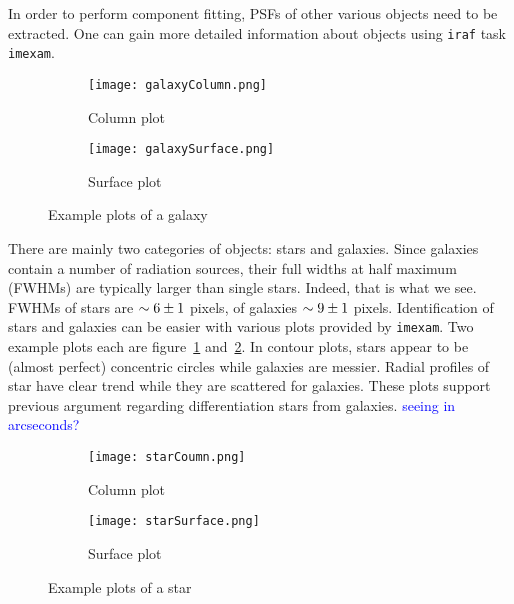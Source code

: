 In order to perform component fitting, PSFs of other various objects need to be extracted. One can gain more detailed information about objects using \verb|iraf| task \verb|imexam|. 

\begin{figure}[ht]
   \centering
   \begin{subfigure}[t]{0.5\textwidth}
   \begin{center}
   \texttt{[image: galaxyColumn.png]}
   \end{center}
   \caption{Column plot}
   \end{subfigure}%
   \begin{subfigure}[t]{0.5\textwidth}
   \begin{center}
   \texttt{[image: galaxySurface.png]}
   \end{center}
   \caption{Surface plot}
   \end{subfigure}
   \caption{Example plots of a galaxy}%
   \label{fig:galaxyPlots}
\end{figure}

There are mainly two categories of objects: stars and galaxies. Since galaxies contain a number of radiation sources, their full widths at half maximum (FWHMs) are typically larger than single stars. Indeed, that is what we see. FWHMs of stars are $\sim\num{6+-1}$ pixels, of galaxies $\sim\num{9+-1}$ pixels. Identification of stars and galaxies can be easier with various plots provided by \verb|imexam|. Two example plots each are figure~\ref{fig:galaxyPlots} and~\ref{fig:starPlots}. In contour plots, stars appear to be (almost perfect) concentric circles while galaxies are messier. Radial profiles of star have clear trend while they are scattered for galaxies. These plots support previous argument regarding differentiation stars from galaxies.
\textcolor{blue}{seeing in arcseconds?}
\begin{figure}[ht]
   \centering
   \begin{subfigure}[t]{0.5\textwidth}
   \begin{center}
   \texttt{[image: starCoumn.png]}
   \end{center}
   \caption{Column plot}
   \end{subfigure}%
   \begin{subfigure}[t]{0.5\textwidth}
   \begin{center}
   \texttt{[image: starSurface.png]}
   \end{center}
   \caption{Surface plot}
   \end{subfigure}
   \caption{Example plots of a star}%
   \label{fig:starPlots}
\end{figure}

